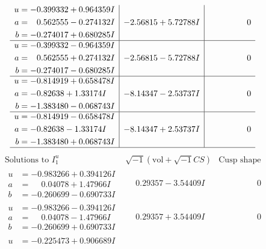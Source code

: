 \documentclass[1p]{elsarticle_modified}
\theoremstyle{definition}
\newcommand{\I}{\sqrt{-1}}
\begin{document}
$$\begin{array}{c|c|c}
\begin{aligned}
u &= -0.399332 + 0.964359 I \\
a &= \phantom{-}0.562555 - 0.274132 I \\
b &= -0.274017 + 0.680285 I\end{aligned}
 & -2.56815 + 5.72788 I & \phantom{-0.000000 } 0 \\ \hline\begin{aligned}
u &= -0.399332 - 0.964359 I \\
a &= \phantom{-}0.562555 + 0.274132 I \\
b &= -0.274017 - 0.680285 I\end{aligned}
 & -2.56815 - 5.72788 I & \phantom{-0.000000 } 0 \\ \hline\begin{aligned}
u &= -0.814919 + 0.658478 I \\
a &= -0.82638 + 1.33174 I \\
b &= -1.383480 - 0.068743 I\end{aligned}
 & -8.14347 - 2.53737 I & \phantom{-0.000000 } 0 \\ \hline\begin{aligned}
u &= -0.814919 - 0.658478 I \\
a &= -0.82638 - 1.33174 I \\
b &= -1.383480 + 0.068743 I\end{aligned}
 & -8.14347 + 2.53737 I & \phantom{-0.000000 } 0\\
 \hline 
 \end{array}$$\newpage$$\begin{array}{c|c|c}  
\text{Solutions to }I^u_{1}& \I (\text{vol} + \sqrt{-1}CS) & \text{Cusp shape}\\
 \hline 
\begin{aligned}
u &= -0.983266 + 0.394126 I \\
a &= \phantom{-}0.04078 + 1.47966 I \\
b &= -0.260699 - 0.690733 I\end{aligned}
 & \phantom{-}0.29357 - 3.54409 I & \phantom{-0.000000 } 0 \\ \hline\begin{aligned}
u &= -0.983266 - 0.394126 I \\
a &= \phantom{-}0.04078 - 1.47966 I \\
b &= -0.260699 + 0.690733 I\end{aligned}
 & \phantom{-}0.29357 + 3.54409 I & \phantom{-0.000000 } 0 \\ \hline\begin{aligned}
u &= -0.225473 + 0.906689 I \\

\end{aligned}
\end{array}$$
\end{document}
